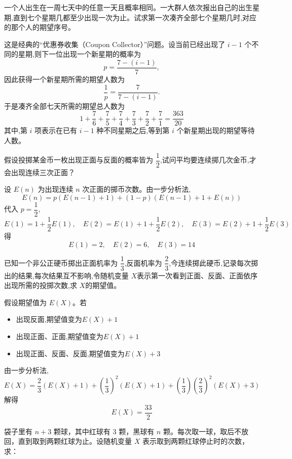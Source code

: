 \begin{questions}
    \question 一个人出生在一周七天中的任意一天且概率相同。一大群人依次报出自己的出生星期,直到七个星期几都至少出现一次为止。试求第一次凑齐全部七个星期几时,对应的那个人的期望序号。
    \begin{solution}
        这是经典的“优惠券收集（Coupon Collector）”问题。设当前已经出现了 $i-1$ 个不同的星期,则下一位出现一个新星期的概率为
        \[
        p=\frac{7-(i-1)}{7},
        \]
        因此获得一个新星期所需的期望人数为
        \[
        \frac{1}{p}=\frac{7}{7-(i-1)}.
        \]
        于是凑齐全部七天所需的期望总人数为
        \[
        1+\frac{7}{6}+\frac{7}{5}+\frac{7}{4}+\frac{7}{3}+\frac{7}{2}+\frac{7}{1}=\frac{363}{20}
        \]
        其中,第 $i$ 项表示在已有 $i-1$ 种不同星期之后,等到第 $i$ 个新星期出现的期望等待人数。
    \end{solution}

    \question 假设投掷某金币一枚出现正面与反面的概率皆为 $\dfrac{1}{2}$,试问平均要连续掷几次金币,才会出现连续三次正面？
    \begin{solution}
        设 $E(n)$ 为出现连续 $n$ 次正面的掷币次数。由一步分析法,
        \[
        E(n) = p(E(n-1) + 1) + (1-p)(E(n-1) + 1 + E(n))
        \]
        代入 $p = \dfrac{1}{2}$,
        \[
        E(1) = 1 + \frac{1}{2} E(1), \quad E(2) = E(1) + 1 + \frac{1}{2} E(2), \quad E(3) = E(2) + 1 + \frac{1}{2} E(3)
        \]
        得
        \[
        E(1) = 2, \quad E(2) = 6, \quad E(3) = 14
        \]
    \end{solution}

    \question 已知一个非公正硬币掷出正面机率为 $\dfrac{1}{3}$,反面机率为 $\dfrac{2}{3}$,今连续掷此硬币,记录每次掷出的结果,每次结果互不影响,令随机变量 $X$表示第一次看到正面、反面、正面依序出现所需的投掷次数,求 $X$的期望值。
    \begin{solution}
        假设期望值为 $E(X)$。若
        \begin{itemize}
        \item 出现反面,期望值变为$E(X)+1$
        \item 出现正面、正面,期望值变为$E(X)+1$
        \item 出现正面、反面、反面,期望值变为$E(X)+3$
        \end{itemize}
        由一步分析法,
        \[
        E(X)=\frac{2}{3}(E(X)+1)+\left(\frac{1}{3}\right)^2(E(X)+1)+\left(\frac{1}{3}\right)\left(\frac{2}{3}\right)^2(E(X)+3)
        \]
        解得
        \[
        E(X)=\frac{33}{2}
        \]
    \end{solution}

    \question 袋子里有 $n+3$ 颗球，其中红球有 3 颗，黑球有 $n$ 颗。每次取一球，取后不放回，直到取到两颗红球为止。设随机变量 $X$ 表示取到两颗红球停止时的次数，求：
    \begin{parts}

\end{parts}
\end{questions}
